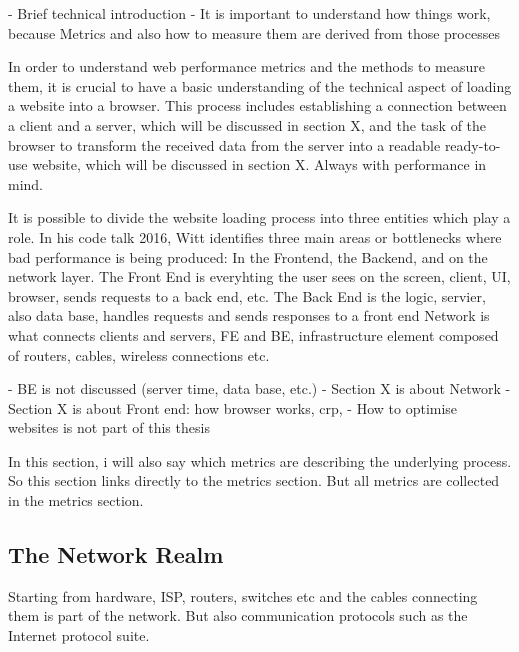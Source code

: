 - Brief technical introduction
- It is important to understand how things work, because Metrics and also how to measure them are derived from those processes

In order to understand web performance metrics and the methods to measure them, it is crucial to have a basic understanding of the technical aspect of loading a website into a browser.
This process includes establishing a connection between a client and a server, which will be discussed in section X, and the task of the browser to transform the received data from the server into a readable ready-to-use website, which will be discussed in section X.
Always with performance in mind.

It is possible to divide the website loading process into three entities which play a role.
In his code talk 2016, Witt identifies three main areas or bottlenecks where bad performance is being produced: In the Frontend, the Backend, and on the network layer.  %
The Front End is everyhting the user sees on the screen, client, UI, browser, sends requests to a back end, etc.
The Back End is the logic, servier, also data base, handles requests and sends responses to a front end
Network is what connects clients and servers, FE and BE, infrastructure element composed of routers, cables, wireless connections etc.


- BE is not discussed (server time, data base, etc.)
- Section X is about Network
- Section X is about Front end: how browser works, crp, 
- How to optimise websites is not part of this thesis

In this section, i will also say which metrics are describing the underlying process.
So this section links directly to the metrics section.
But all metrics are collected in the metrics section.





\subsection{The Network Realm}

Starting from hardware, ISP, routers, switches etc and the cables connecting them is part of the network.
But also communication protocols such as the Internet protocol suite.

